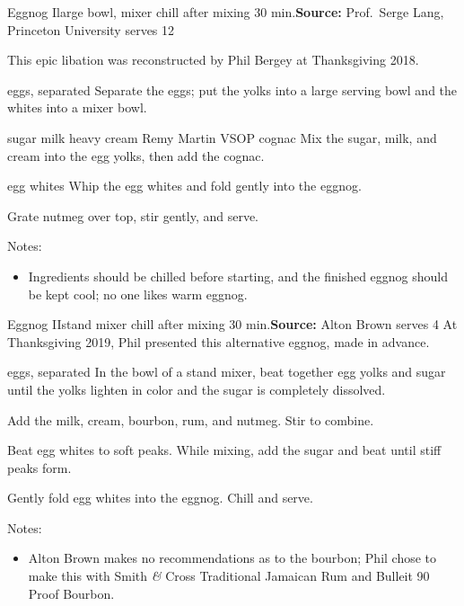 \begin{recipe}{Eggnog I}{large bowl, mixer \hfill chill after mixing \hfill 30 min.}{\textbf{Source:} Prof.\ Serge Lang, Princeton University \hfill serves 12}

 \freeform This epic libation was reconstructed by Phil Bergey at Thanksgiving 2018.

 \ing[12]{} {eggs, separated}
 Separate the eggs; put the yolks into a large serving bowl and the whites into a mixer bowl.

  {sugar}
  {milk}
  {heavy cream}
  {Remy Martin VSOP cognac}
 Mix the sugar, milk, and cream into the egg yolks, then add the cognac.

 \ing[12]{} {egg whites}
 Whip the egg whites and fold gently into the eggnog.

 Grate nutmeg over top, stir gently, and serve.

 \freeform Notes:
 \begin{itemize}
  \item Ingredients should be chilled before starting, and the finished eggnog should be kept cool; no one likes warm eggnog.
 \end{itemize}

\end{recipe}

\begin{recipe}{Eggnog II}{stand mixer \hfill chill after mixing \hfill 30 min.}{\textbf{Source:} Alton Brown \hfill serves 4}
 \freeform At Thanksgiving 2019, Phil presented this alternative eggnog, made in advance.

 \ing[4]{} {eggs, separated}
 In the bowl of a stand mixer, beat together egg yolks and sugar until the yolks lighten in color and the sugar is completely dissolved.

 Add the milk, cream, bourbon, rum, and nutmeg. Stir to combine.

 Beat egg whites to soft peaks. While mixing, add the sugar and beat until stiff peaks form.

 \newstep Gently fold egg whites into the eggnog. Chill and serve.

 \freeform Notes:
 \begin{itemize}
  \item Alton Brown makes no recommendations as to the bourbon; Phil chose to make this with Smith \textit{\&} Cross Traditional Jamaican Rum and Bulleit 90 Proof Bourbon.
 \end{itemize}
\end{recipe}
